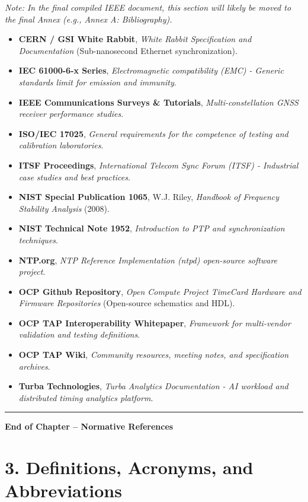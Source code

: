 \documentclass[
]{article}
\begin{document}
\emph{Note: In the final compiled IEEE document, this section will
likely be moved to the final Annex (e.g., Annex A: Bibliography).}

\begin{itemize}
\item
  \textbf{CERN / GSI White Rabbit}, \emph{White Rabbit Specification and
  Documentation} (Sub-nanosecond Ethernet synchronization).
\item
  \textbf{IEC 61000-6-x Series}, \emph{Electromagnetic compatibility
  (EMC) - Generic standards limit for emission and immunity}.
\item
  \textbf{IEEE Communications Surveys \& Tutorials},
  \emph{Multi-constellation GNSS receiver performance studies}.
\item
  \textbf{ISO/IEC 17025}, \emph{General requirements for the competence
  of testing and calibration laboratories}.
\item
  \textbf{ITSF Proceedings}, \emph{International Telecom Sync Forum
  (ITSF) - Industrial case studies and best practices}.
\item
  \textbf{NIST Special Publication 1065}, W.J. Riley, \emph{Handbook of
  Frequency Stability Analysis} (2008).
\item
  \textbf{NIST Technical Note 1952}, \emph{Introduction to PTP and
  synchronization techniques}.
\item
  \textbf{NTP.org}, \emph{NTP Reference Implementation (ntpd)
  open-source software project}.
\item
  \textbf{OCP Github Repository}, \emph{Open Compute Project TimeCard
  Hardware and Firmware Repositories} (Open-source schematics and HDL).
\item
  \textbf{OCP TAP Interoperability Whitepaper}, \emph{Framework for
  multi-vendor validation and testing definitions}.
\item
  \textbf{OCP TAP Wiki}, \emph{Community resources, meeting notes, and
  specification archives}.
\item
  \textbf{Turba Technologies}, \emph{Turba Analytics Documentation - AI
  workload and distributed timing analytics platform}.
\end{itemize}

\begin{center}\rule{0.5\linewidth}{0.5pt}\end{center}

\textbf{End of Chapter -- Normative References}

\section{3. Definitions, Acronyms, and
Abbreviations}\label{definitions-acronyms-and-abbreviations}
\end{document}
